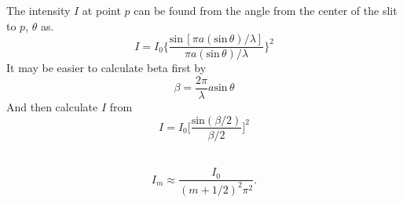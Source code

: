\documentclass[nobib,notoc]{tufte-handout}
\begin{document}
\begin{defi}
	The intensity \(I\) at point \(p\) can be found from the angle from the center of the slit to \(p\), \(\theta\) as.
	\begin{equation*}
		I=I_0\bigg\{\frac{\text{sin}\,[\pi a(\text{sin}\,\theta)/\lambda]}
		{\pi a(\text{sin}\,\theta)/\lambda}\bigg\}^2
	\end{equation*}
	It may be easier to calculate beta first by
	\begin{equation*}
		\beta=\frac{2\pi}{\lambda}a\text{sin}\,\theta
	\end{equation*}
	And then calculate \(I\) from
	\begin{equation*}
		I=I_0\bigg[\frac{\text{sin}(\beta/2)}{\beta/2}\bigg]^2
	\end{equation*}
\end{defi}
\begin{defi}
	\,
	\begin{equation*}
		I_m\approx\frac{I_0}{(m+1/2)^2\pi^2}.
	\end{equation*}
\end{defi}
\end{document}
